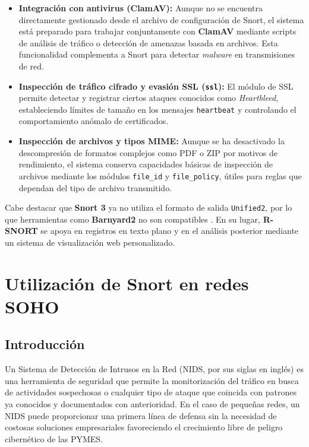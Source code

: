 \documentclass[11pt,a4paper,twoside]{report}
\begin{document}
\begin{itemize}
	\item \textbf{Integración con antivirus (ClamAV):}  
	Aunque no se encuentra directamente gestionado desde el archivo de configuración de Snort, el sistema está preparado para trabajar conjuntamente con \textbf{ClamAV} mediante scripts de análisis de tráfico o detección de amenazas basada en archivos. Esta funcionalidad complementa a Snort para detectar \textit{malware} en transmisiones de red.
	
	\item \textbf{Inspección de tráfico cifrado y evasión SSL (\texttt{ssl}):}  
	El módulo de SSL permite detectar y registrar ciertos ataques conocidos como \textit{Heartbleed}, estableciendo límites de tamaño en los mensajes \texttt{heartbeat} y controlando el comportamiento anómalo de certificados.
	
	\item \textbf{Inspección de archivos y tipos MIME:}  
	Aunque se ha desactivado la descompresión de formatos complejos como PDF o ZIP por motivos de rendimiento, el sistema conserva capacidades básicas de inspección de archivos mediante los módulos \texttt{file\_id} y \texttt{file\_policy}, útiles para reglas que dependan del tipo de archivo transmitido.
\end{itemize}

Cabe destacar que \textbf{Snort 3} ya no utiliza el formato de salida \texttt{Unified2}, por lo que herramientas como \textbf{Barnyard2} no son compatibles \cite{snort_gui_update}. En su lugar, \textbf{R-SNORT} se apoya en registros en texto plano y en el análisis posterior mediante un sistema de visualización web personalizado.

\chapter{Utilización de Snort en redes SOHO}
\section{Introducción}
Un Sistema de Detección de Intrusos en la Red (NIDS, por sus siglas en inglés) es una herramienta de seguridad que permite la monitorización del tráfico en busca de actividades sospechosas o cualquier tipo de ataque que coincida con patrones ya conocidos y documentados con anterioridad. En el caso de pequeñas redes, un NIDS puede proporcionar una primera línea de defensa sin la necesidad de costosas soluciones empresariales favoreciendo el crecimiento libre de peligro cibernético de las PYMES.
\newline
\end{document}

